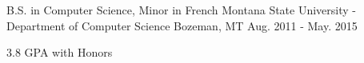 

\begin{cventries}

  \cventry
    {B.S. in Computer Science, Minor in French} %
    {Montana State University - Department of Computer Science} %
    {Bozeman, MT} %
    {Aug. 2011 - May. 2015} %
    {
      \begin{cvitems} %
        \item {3.8 GPA with Honors}
      \end{cvitems}
    }

\end{cventries}
